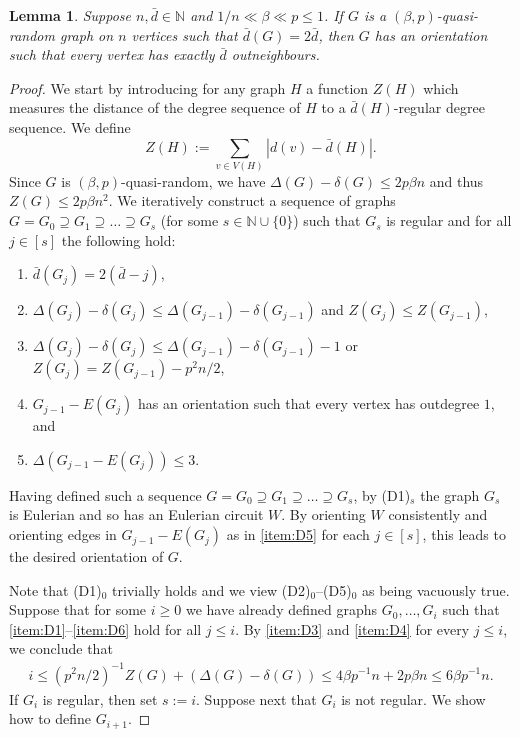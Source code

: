 \documentclass[a4paper, 11pt, reqno]{amsart}
\newtheorem{lemma}[definition]{Lemma}
\numberwithin{equation}{section}
\newcommand{\1}{{\rm 1\hspace*{-0.4ex}%
\rule{0.1ex}{1.52ex}\hspace*{0.2ex}}}
\newcommand{\N}{\mathbb N}
\begin{document}
\begin{lemma}\label{lem: orientation}
Suppose $n, \bar{d} \in \N$ and $1/n \ll \beta \ll p \leq 1$.
If $G$ is a $(\beta,p)$-quasi-random graph on $n$ vertices
such that $\bar{d}(G)=2\bar{d}$, then $G$ has an orientation such that every vertex has exactly $\bar{d}$ outneighbours.
\end{lemma}
\begin{proof}
We start by introducing for any graph $H$ a function $Z(H)$ which measures the distance of the degree sequence of $H$ to a $\bar{d}(H)$-regular degree sequence.
We define $$Z(H):=\sum_{v\in V(H)}|d(v)-\bar{d}(H)|.$$
Since $G$ is $(\beta,p)$-quasi-random, we have $\Delta(G)- \delta(G)\leq 2p\beta n$ and thus $Z(G)\leq 2p\beta n^2$. 
We iteratively construct a sequence of graphs $G=G_0\supseteq G_1\supseteq\ldots\supseteq G_s$ (for some $s\in \N\cup \{0\}$) such that 
$G_s$ is regular and for all $j\in [s]$ the following hold:
\begin{enumerate}[label=(D\arabic*)$_j$]

	\item\label{item:D1}  $\bar{d}(G_{j})= 2(\bar{d}-j)$,
	\item\label{item:D3}  $\Delta(G_{j})-\delta(G_{j})\leq \Delta(G_{j-1})-\delta(G_{j-1})$ and
	$Z(G_{j})\leq Z(G_{j-1})$,
	\item\label{item:D4}  $\Delta(G_{j})-\delta(G_{j})\leq \Delta(G_{j-1})-\delta(G_{j-1})-1$ or
	$Z(G_{j}) = Z(G_{j-1}) -p^2 n/2$,
	\item\label{item:D5}  $G_{j-1}- E(G_{j})$ has an orientation such that every vertex has outdegree $1$, and
	\item\label{item:D6}  $\Delta(G_{j-1}- E(G_{j}))\leq 3$.
\end{enumerate}
Having defined such a sequence $G=G_0\supseteq G_1\supseteq\ldots\supseteq G_s$,
by (D1)$_s$ the graph $G_s$ is Eulerian and so has an Eulerian circuit $W$.
By orienting $W$ consistently and orienting edges in $G_{j-1}-E(G_{j})$ as in \ref{item:D5} for each $j\in [s]$, this leads to the desired orientation of $G$.

Note that (D1)$_{0}$ trivially holds and we view (D2)$_0$--(D5)$_0$ as being vacuously true.
Suppose that for some $i\geq 0$ we have already defined graphs $G_0,\ldots,G_{i}$ such that \ref{item:D1}--\ref{item:D6} hold for all $j\leq i$.
By \ref{item:D3} and \ref{item:D4} for every $j\leq i$, 
we conclude  that 
\begin{align}\label{eq:orient}
	i\leq (p^2n/2)^{-1}Z(G)+ (\Delta(G)-\delta(G)) \leq 4\beta p^{-1}n+ 2p\beta n \leq 6\beta p^{-1}n.
\end{align}
If $G_i$ is regular, then set $s:=i$. Suppose next that $G_i$ is not regular. We show how to define $G_{i+1}$.


\end{proof}
\end{document}
